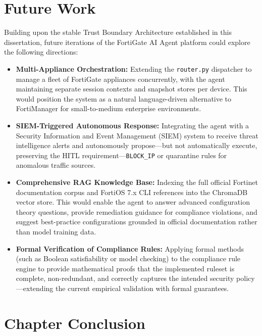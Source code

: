 \section{Future Work}
\label{sec:future}

Building upon the stable Trust Boundary Architecture established in this dissertation, future iterations of the FortiGate AI Agent platform could explore the following directions:

\begin{itemize}
    \item \textbf{Multi-Appliance Orchestration:} Extending the \texttt{router.py} dispatcher to manage a fleet of FortiGate appliances concurrently, with the agent maintaining separate session contexts and snapshot stores per device. This would position the system as a natural language-driven alternative to FortiManager for small-to-medium enterprise environments.
    \item \textbf{SIEM-Triggered Autonomous Response:} Integrating the agent with a Security Information and Event Management (SIEM) system to receive threat intelligence alerts and autonomously propose—but not automatically execute, preserving the HITL requirement—\texttt{BLOCK\_IP} or quarantine rules for anomalous traffic sources.
    \item \textbf{Comprehensive RAG Knowledge Base:} Indexing the full official Fortinet documentation corpus and FortiOS 7.x CLI references into the ChromaDB vector store. This would enable the agent to answer advanced configuration theory questions, provide remediation guidance for compliance violations, and suggest best-practice configurations grounded in official documentation rather than model training data.
    \item \textbf{Formal Verification of Compliance Rules:} Applying formal methods (such as Boolean satisfiability or model checking) to the compliance rule engine to provide mathematical proofs that the implemented ruleset is complete, non-redundant, and correctly captures the intended security policy—extending the current empirical validation with formal guarantees.
\end{itemize}

\section{Chapter Conclusion}
\label{sec:chap4_conclusion}

